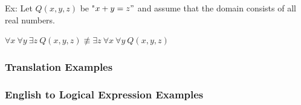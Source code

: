 \documentclass[12pt, letterpaper]{article}
\begin{document}
\bigbreak
\bigbreak

Ex: Let $Q(x,y,z)$ be "$x+y=z"$ and assume that the domain consists of all real numbers. \\
\begin{center}
	$\forall x \ \forall y \ \exists z \ Q(x,y,z) \not\equiv \exists z \ \forall x \ \forall y \ Q(x,y,z)$
\end{center}

\pagebreak

\vspace*{-2cm} \subsubsection{Translation Examples}
\subsubsection*{English to Logical Expression Examples}
\bigbreak
\end{document}
